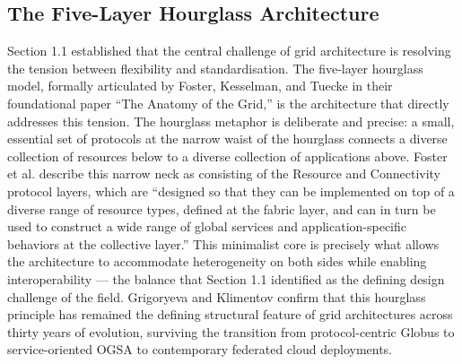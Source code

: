 \documentclass[12pt,a4paper]{report}
\begin{document}
\subsection*{The Five-Layer Hourglass Architecture}
Section 1.1 established that the central challenge of grid architecture is resolving the tension between flexibility and 
standardisation. The five-layer hourglass model, formally articulated by Foster, Kesselman, and Tuecke \parencite{foster2001}in their 
foundational paper “The Anatomy of the Grid,” is the architecture that directly addresses this tension. The hourglass metaphor is
 deliberate and precise: a small, essential set of protocols at the narrow waist of the hourglass connects a diverse collection of 
 resources below to a diverse collection of applications above. Foster et al. \parencite{foster2001} describe this narrow neck as consisting of the
  Resource and Connectivity protocol layers, which are “designed so that they can be implemented on top of a diverse range of resource 
  types, defined at the fabric layer, and can in turn be used to construct a wide range of global services and application-specific
   behaviors at the collective layer.” This minimalist core is precisely what allows the architecture to accommodate heterogeneity 
   on both sides while enabling interoperability — the balance that Section 1.1 identified as the defining design challenge of the field. 
   Grigoryeva and Klimentov \parencite{grigoryeva2024} confirm that this hourglass principle has remained the defining structural feature of grid architectures 
   across thirty years of evolution, surviving the transition from protocol-centric Globus to service-oriented OGSA to contemporary federated
    cloud deployments.
\end{document}
